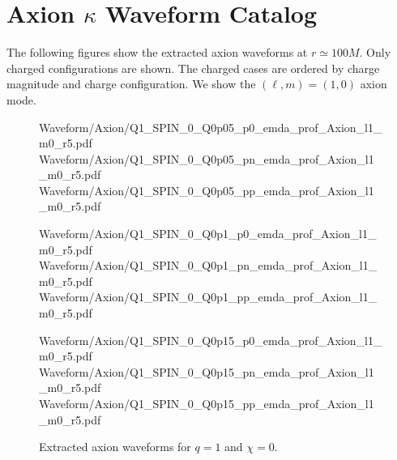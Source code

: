 \section{\texorpdfstring{Axion $\kappa$ Waveform Catalog}{Axion Waveform Catalog}}
\label{app:axion_waveform_catalog}

The following figures show the extracted axion waveforms at
$r\simeq 100M$. Only charged configurations are shown. The charged
cases are ordered by charge magnitude and charge configuration. We show
the $(\ell,m)=(1,0)$ axion mode.

\begin{figure}[p]
\centering

{Waveform/Axion/Q1_SPIN_0_Q0p05_p0_emda_prof_Axion_l1_m0_r5.pdf}
\hfill
{}
{Waveform/Axion/Q1_SPIN_0_Q0p05_pn_emda_prof_Axion_l1_m0_r5.pdf}
\hfill
{}
{Waveform/Axion/Q1_SPIN_0_Q0p05_pp_emda_prof_Axion_l1_m0_r5.pdf}

\vspace{0.6em}

{Waveform/Axion/Q1_SPIN_0_Q0p1_p0_emda_prof_Axion_l1_m0_r5.pdf}
\hfill
{}
{Waveform/Axion/Q1_SPIN_0_Q0p1_pn_emda_prof_Axion_l1_m0_r5.pdf}
\hfill
{}
{Waveform/Axion/Q1_SPIN_0_Q0p1_pp_emda_prof_Axion_l1_m0_r5.pdf}

\vspace{0.6em}

{Waveform/Axion/Q1_SPIN_0_Q0p15_p0_emda_prof_Axion_l1_m0_r5.pdf}
\hfill
{}
{Waveform/Axion/Q1_SPIN_0_Q0p15_pn_emda_prof_Axion_l1_m0_r5.pdf}
\hfill
{}
{Waveform/Axion/Q1_SPIN_0_Q0p15_pp_emda_prof_Axion_l1_m0_r5.pdf}

\caption{Extracted axion waveforms for $q=1$ and $\chi=0$.}
\label{fig:axion_catalog_q1_chi0}
\end{figure}

